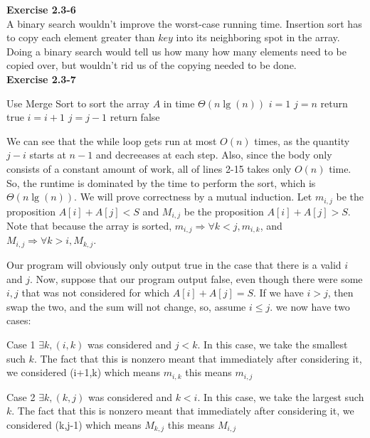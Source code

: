 \documentclass{article}
\begin{document}
\noindent\textbf{Exercise 2.3-6}\\

A binary search wouldn't improve the worst-case running time.  Insertion sort has to copy each element greater than $key$ into its neighboring spot in the array.  Doing a binary search would tell us how many how many elements need to be copied over, but wouldn't rid us of the copying needed to be done. \\

\noindent\textbf{Exercise 2.3-7}\\

\begin{algorithm} \begin{algorithmic}[1]
 \State Use Merge Sort to sort the array $A$ in time $\Theta(n\lg(n))$
\State $i=1$
\State $j = n$
 \State return true
 \EndIf
 \State $ i = i+1$
 \EndIf 
 \State $ j = j-1$
 \EndIf 
 \EndWhile
 \State return false
 \end{algorithmic}
\end{algorithm}

We can see that the while loop gets run at most $O(n)$ times, as the quantity $j-i$ starts at $n-1$ and decreeases at each step. Also, since the body only consists of a constant amount of work, all of lines 2-15 takes only $O(n)$ time. So, the runtime is dominated by the time to perform the sort, which is $\Theta(n\lg(n))$. We will prove correctness by a mutual induction. Let $m_{i,j}$ be the proposition $A[i]+A[j]<S$ and $M_{i,j}$ be the proposition $A[i]+A[j]>S$. Note that because the array is sorted, $m_{i,j} \Rightarrow \forall k<j, m_{i,k}$, and $M_{i,j} \Rightarrow \forall k>i, M_{k,j}$. 

Our program will obviously only output true in the case that there is a valid $i$ and $j$. Now, suppose that our program output false, even though there were some $i,j$ that was not considered for which $A[i]+A[j]=S$. If we have $i>j$, then swap the two, and the sum will not change, so, assume $i\le j$. we now have two cases:

Case 1 $\exists k, (i,k)$ was considered and $j<k$. In this case, we take the smallest such $k$. The fact that this is nonzero meant that immediately after considering it, we considered (i+1,k) which means $m_{i,k}$ this means $m_{i,j}$

Case 2 $\exists k, (k,j)$ was considered and $k<i$. In this case, we take the largest such $k$. The fact that this is nonzero meant that immediately after considering it, we considered (k,j-1) which means $M_{k,j}$ this means $M_{i,j}$
\end{document}
